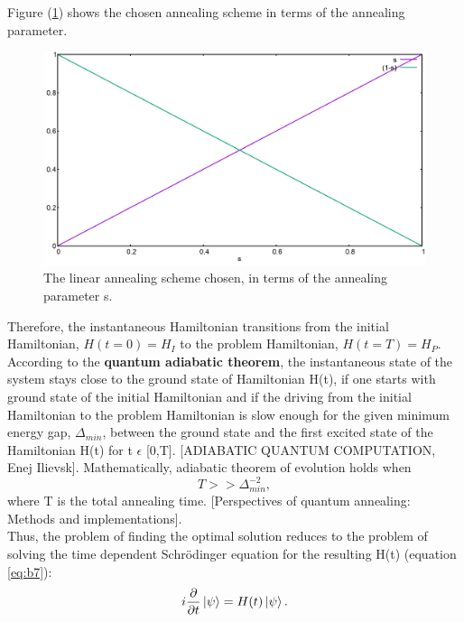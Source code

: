 \documentclass[12]{article}
\begin{document}
Figure (\ref{fig:b1}) shows the chosen annealing scheme in terms of the annealing parameter.
\begin{figure}[H]
\centering 
\includegraphics[scale=0.3]{Scheme.png}
\caption{The linear annealing scheme chosen, in terms of the annealing parameter s.}
\label{fig:b1}
\end{figure}
Therefore, the instantaneous Hamiltonian transitions from the initial Hamiltonian, $H(t=0)=H_I$ to the problem Hamiltonian, $H(t=T)=H_P$. \\

According to the \textbf{quantum adiabatic theorem}, the instantaneous state of the system stays close to the ground state of Hamiltonian H(t), if one starts with ground state of the initial Hamiltonian and if the driving from the initial Hamiltonian to the problem Hamiltonian is slow enough for the given minimum energy gap, $\Delta_{min}$, between the ground state and the first excited state of the Hamiltonian H(t) for t $\epsilon$ [0,T]. [ADIABATIC QUANTUM COMPUTATION, Enej Ilievsk]. Mathematically, adiabatic theorem of evolution holds when 
\begin{equation}
T>> {\Delta}_{min}^{-2}, \label{eq:b8}
\end{equation}
where T is the total annealing time. [Perspectives of quantum annealing: Methods and implementations].\\
Thus, the problem of finding the optimal solution reduces to the problem of solving the time dependent Schr{\"o}dinger equation for the resulting H(t) (equation \ref{eq:b7}):
\begin{equation}
i\frac{\partial}{\partial t}\ket{\psi}=H(t)\ket{\psi}.    \label{eq:b9}
\end{equation}
\end{document}
